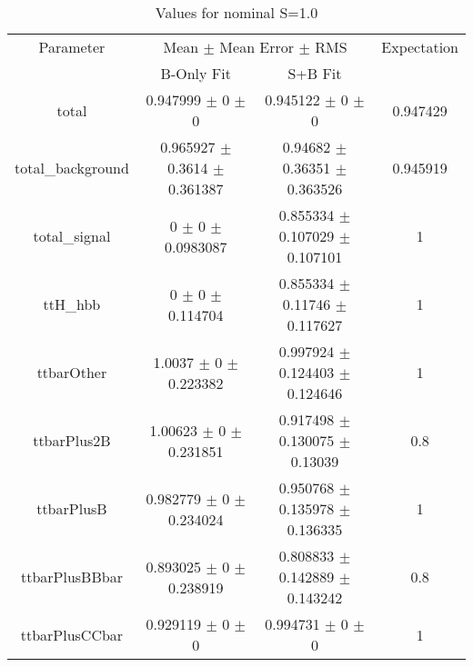 \begin{table}
\centering
\caption{Values for nominal S=1.0}
\begin{tabular}{cccc}
\toprule
Parameter & \multicolumn{2}{c}{Mean $\pm$ Mean Error $\pm$ RMS} & Expectation\\
 & B-Only Fit & S+B Fit & \\
\midrule
total & \num{0.947999} $\pm$ \num{0} $\pm$ \num{0} & \num{0.945122} $\pm$ \num{0} $\pm$ \num{0} & \num{0.947429}\\
total\_background & \num{0.965927} $\pm$ \num{0.3614} $\pm$ \num{0.361387} & \num{0.94682} $\pm$ \num{0.36351} $\pm$ \num{0.363526} & \num{0.945919}\\
total\_signal & \num{0} $\pm$ \num{0} $\pm$ \num{0.0983087} & \num{0.855334} $\pm$ \num{0.107029} $\pm$ \num{0.107101} & \num{1}\\
ttH\_hbb & \num{0} $\pm$ \num{0} $\pm$ \num{0.114704} & \num{0.855334} $\pm$ \num{0.11746} $\pm$ \num{0.117627} & \num{1}\\
ttbarOther & \num{1.0037} $\pm$ \num{0} $\pm$ \num{0.223382} & \num{0.997924} $\pm$ \num{0.124403} $\pm$ \num{0.124646} & \num{1}\\
ttbarPlus2B & \num{1.00623} $\pm$ \num{0} $\pm$ \num{0.231851} & \num{0.917498} $\pm$ \num{0.130075} $\pm$ \num{0.13039} & \num{0.8}\\
ttbarPlusB & \num{0.982779} $\pm$ \num{0} $\pm$ \num{0.234024} & \num{0.950768} $\pm$ \num{0.135978} $\pm$ \num{0.136335} & \num{1}\\
ttbarPlusBBbar & \num{0.893025} $\pm$ \num{0} $\pm$ \num{0.238919} & \num{0.808833} $\pm$ \num{0.142889} $\pm$ \num{0.143242} & \num{0.8}\\
ttbarPlusCCbar & \num{0.929119} $\pm$ \num{0} $\pm$ \num{0} & \num{0.994731} $\pm$ \num{0} $\pm$ \num{0} & \num{1}\\
\bottomrule
\end{tabular}
\end{table}
